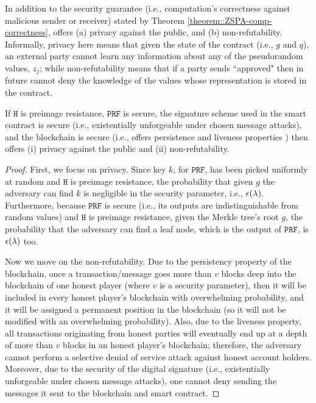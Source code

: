 In addition to the security guarantee (i.e., computation's correctness against malicious sender or receiver) stated by Theorem \ref{theorem::ZSPA-comp-correctness}, \zspa offers  (a) privacy against the public, and (b)  non-refutability. Informally, privacy here means that given the state of the contract (i.e., $g$ and  $q$), an external party cannot learn any information about any of the pseudorandom values,  $z_{\scriptscriptstyle j}$; while non-refutability means that if a party sends ``approved" then in future cannot deny the knowledge of the values whose representation is stored in the contract. %


 \vspace{-2mm}
\begin{theorem}
If  $\mathtt{H}$ is preimage resistance, $\mathtt{PRF}$ is secure, the signature scheme used in the smart contract is secure (i.e., existentially unforgeable under chosen message attacks), and the blockchain is secure (i.e., offers persistence and liveness properties \cite{GarayKL15}) then \zspa offers (i) privacy against the public and (ii) non-refutability. 
\end{theorem}
 
 

\begin{proof}
First, we focus on privacy. Since key $k$, for $\mathtt{PRF}$, has been picked uniformly at random and $\mathtt{H}$ is preimage resistance, the probability that given $g$ the adversary can find $k$ is negligible in the security parameter, i.e., $\epsilon(\lambda)$. Furthermore, because $\mathtt{PRF}$ is secure (i.e., its outputs are indistinguishable from random values) and  $\mathtt{H}$ is preimage resistance, given the Merkle tree's root $g$, the probability that the adversary can find a leaf node, which is the output of $\mathtt{PRF}$, is $\epsilon(\lambda)$ too. 

Now we move on the non-refutability. Due to the persistency property of the blockchain, once a transaction/message goes more than $v$ blocks deep into the blockchain of one honest player (where $v$ is a security parameter), then it will be included in every honest player's blockchain with overwhelming probability, and it will be assigned a permanent
position in the blockchain (so it will not be modified with an overwhelming probability). Also, due to the liveness property,   all transactions originating from honest parties will eventually end up at a depth of more than $v$ blocks in an honest player's blockchain; therefore, the adversary cannot
perform a selective denial of service attack against honest account holders.  Moreover, due to the security of the digital signature (i.e., existentially unforgeable under chosen message attacks), one cannot deny sending the messages it sent to the blockchain and smart contract. 
\end{proof}
